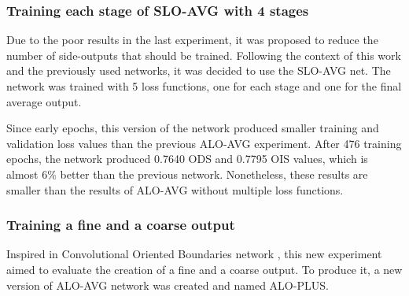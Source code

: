 


\subsubsection{Training each stage of SLO-AVG with 4 stages}
\label{sssec:train_stage_slo_avg}

Due to the poor results in the last experiment, it was proposed to reduce the number of side-outputs that should be trained.
Following the context of this work and the previously used networks, it was decided to use the SLO-AVG net.
The network was trained with 5 loss functions, one for each stage and one for the final average output.

Since early epochs, this version of the network produced smaller training and validation loss values than the previous ALO-AVG experiment.
After 476 training epochs, the network produced 0.7640 ODS and 0.7795 OIS values, which is almost 6\% better than the previous network.
Nonetheless, these results are smaller than the results of ALO-AVG without multiple loss functions.

\subsubsection{Training a fine and a coarse output}
\label{sssec:train_alo_plus}

Inspired in Convolutional Oriented Boundaries network \cite{COB:2016}, this new experiment aimed to evaluate the creation of a fine and a coarse output.
To produce it, a new version of ALO-AVG network was created and named ALO-PLUS.

